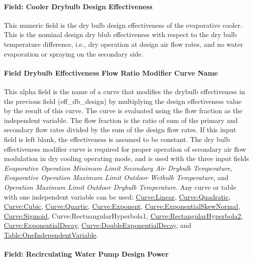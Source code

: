 \paragraph{Field: Cooler Drybulb Design Effectiveness}\label{field-cooler-drybulb-design-effectiveness}

This numeric field is the dry bulb design effectiveness of the evaporative cooler. This is the nominal design dry blub effectiveness with respect to the dry bulb temperature difference, i.e., dry operation at design air flow rates, and no water evaporation or spraying on the secondary side.

\paragraph{Field Drybulb Effectiveness Flow Ratio Modifier Curve Name}\label{field-drybulb-effectiveness-flow-ratio-modifier-curve-name}

This alpha field is the name of a curve that modifies the drybulb effectiveness in the previous field (eff\_db\_design) by multiplying the design effectiveness value by the result of this curve. The curve is evaluated using the flow fraction as the independent variable. The flow fraction is the ratio of sum of the primary and secondary flow rates divided by the sum of the design flow rates. If this input field is left blank, the effectiveness is assumed to be constant. The dry bulb effectiveness modifier curve is required for proper operation of secondary air flow modulation in dry cooling operating mode, and is used with the three input fields \textit{Evaporative Operation Minimum Limit Secondary Air Drybulb Temperature}, \textit{Evaporative Operation Maximum Limit Outdoor Wetbulb Temperature}, and \textit{Operation Maximum Limit Outdoor Drybulb Temperature}. Any curve or table with one independent variable can be used: \hyperref[curvelinear]{Curve:Linear}, \hyperref[curvequadratic]{Curve:Quadratic}, \hyperref[curvecubic]{Curve:Cubic}, \hyperref[curvequartic]{Curve:Quartic}, \hyperref[curveexponent]{Curve:Exponent}, \hyperref[curveexponentialskewnormal]{Curve:ExponentialSkewNormal}, \hyperref[curvesigmoid]{Curve:Sigmoid}, Curve:RectuangularHyperbola1, \hyperref[curverectangularhyperbola2]{Curve:RectangularHyperbola2}, \hyperref[curveexponentialdecay]{Curve:ExponentialDecay}, \hyperref[curvedoubleexponentialdecay]{Curve:DoubleExponentialDecay}, and \hyperref[tableoneindependentvariable]{Table:OneIndependentVariable}.

\paragraph{Field: Recirculating Water Pump Design Power}\label{field-recirculating-water-pump-design-power}

